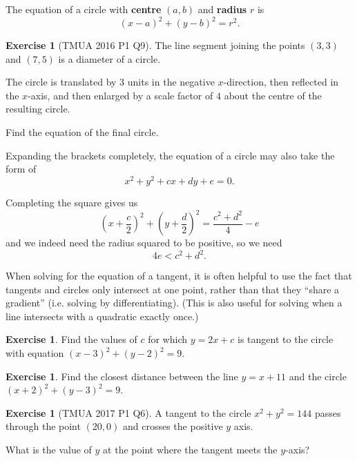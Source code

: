 \documentclass[11pt]{article}
\theoremstyle{definition}
\newtheorem{example}[theorem]{Exercise}
\theoremstyle{remark}
\newcommand{\pqty}[1]{\left(#1\right)}
\begin{document}
The equation of a circle with \textbf{centre} \(\pqty{a, b}\) and \textbf{radius} \(r\) is
\[
    \pqty{x - a}^2 + \pqty{y - b}^2 = r^2.
\]

\begin{example}[TMUA 2016 P1 Q9]\label{tmua-3-unit-013}
    The line segment joining the points \(\pqty{3, 3}\) and \(\pqty{7, 5}\) is a diameter of a circle.

    The circle is translated by \(3\) units in the negative \(x\)-direction, then reflected in the \(x\)-axis, and then enlarged by a scale factor of \(4\) about the centre of the resulting circle.

    Find the equation of the final circle.
\end{example}

Expanding the brackets completely, the equation of a circle may also take the form of
\[
    x^2 + y^2 + cx + dy + e = 0.
\]

Completing the square gives us
\[
    \pqty{x + \frac{c}{2}}^2 + \pqty{y + \frac{d}{2}}^2 = \frac{c^2 + d^2}{4} - e
\]
and we indeed need the radius squared to be positive, so we need
\[
    4e < c^2 + d^2.
\]

When solving for the equation of a tangent, it is often helpful to use the fact that tangents and circles only intersect at one point, rather than that they ``share a gradient'' (i.e. solving by differentiating). (This is also useful for solving when a line intersects with a quadratic exactly once.)

\begin{example}\label{tmua-3-unit-014}
    Find the values of \(c\) for which \(y = 2x + c\) is tangent to the circle with equation \(\pqty{x - 3}^2 + \pqty{y - 2}^2 = 9\).
\end{example}

\begin{example}\label{tmua-3-unit-015}
    Find the closest distance between the line \(y = x + 11\) and the circle \(\pqty{x + 2}^2 + \pqty{y - 3}^2 = 9\).
\end{example}

\begin{example}[TMUA 2017 P1 Q6]\label{tmua-3-unit-016}
    A tangent to the circle \(x^2 + y^2 = 144\) passes through the point \(\pqty{20, 0}\) and crosses the positive \(y\) axis.

    What is the value of \(y\) at the point where the tangent meets the \(y\)-axis?
\end{example}
\end{document}

